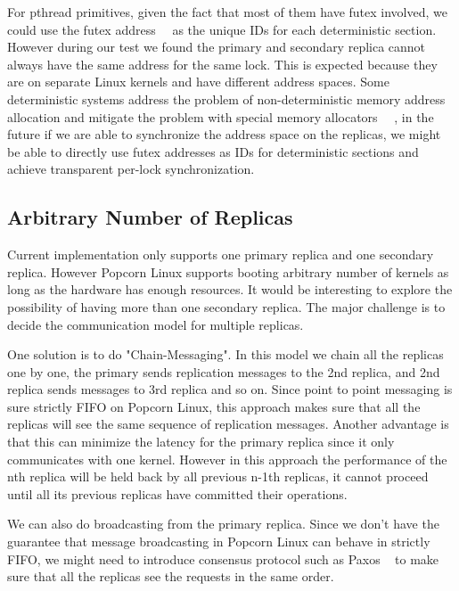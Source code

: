 For pthread primitives, given the fact that most of them have futex involved, we could use the futex address~\cite{drepper2005futexes}~\cite{franke2002fuss} as the unique IDs for each deterministic section. However during our test we found the primary and secondary replica cannot always have the same address for the same lock. This is expected because they are on separate Linux kernels and have different address spaces. Some deterministic systems address the problem of non-deterministic memory address allocation and mitigate the problem with special memory allocators ~\cite{bergan2010deterministic}~\cite{liu2011dthreads}, in the future if we are able to synchronize the address space on the replicas, we might be able to directly use futex addresses as IDs for deterministic sections and achieve transparent per-lock synchronization. 

\subsection{Arbitrary Number of Replicas}
Current implementation only supports one primary replica and one secondary replica. However Popcorn Linux supports booting arbitrary number of kernels as long as the hardware has enough resources. It would be interesting to explore the possibility of having more than one secondary replica. The major challenge is to decide the communication model for multiple replicas.

One solution is to do "Chain-Messaging". In this model we chain all the replicas one by one, the primary sends replication messages to the 2nd replica, and 2nd replica sends messages to 3rd replica and so on. Since point to point messaging is sure strictly FIFO on Popcorn Linux, this approach makes sure that all the replicas will see the same sequence of replication messages. Another advantage is that this can minimize the latency for the primary replica since it only communicates with one kernel. However in this approach the performance of the nth replica will be held back by all previous n-1th replicas, it cannot proceed until all its previous replicas have committed their operations.

We can also do broadcasting from the primary replica. Since we don't have the guarantee that message broadcasting in Popcorn Linux can behave in strictly FIFO, we might need to introduce consensus protocol such as Paxos ~\cite{lamport2001paxos} to make sure that all the replicas see the requests in the same order.

